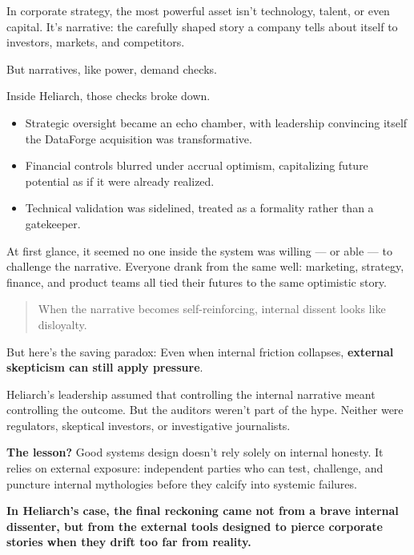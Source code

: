 In corporate strategy, the most powerful asset isn’t technology, talent, or even capital.  
It’s narrative: the carefully shaped story a company tells about itself to investors, markets, and competitors.

\medskip

But narratives, like power, demand checks.

\medskip

Inside Heliarch, those checks broke down.

\begin{itemize}
    \item Strategic oversight became an echo chamber, with leadership convincing itself the DataForge acquisition was transformative.
    \item Financial controls blurred under accrual optimism, capitalizing future potential as if it were already realized.
    \item Technical validation was sidelined, treated as a formality rather than a gatekeeper.
\end{itemize}

At first glance, it seemed no one inside the system was willing — or able — to challenge the narrative.  
Everyone drank from the same well: marketing, strategy, finance, and product teams all tied their futures to the same optimistic story.

\medskip

\begin{quote}
    When the narrative becomes self-reinforcing, internal dissent looks like disloyalty.
\end{quote}

But here’s the saving paradox:  
Even when internal friction collapses, \textbf{external skepticism can still apply pressure}.

\medskip

Heliarch’s leadership assumed that controlling the internal narrative meant controlling the outcome.  
But the auditors weren’t part of the hype.  
Neither were regulators, skeptical investors, or investigative journalists.

\medskip

\textbf{The lesson?}  
Good systems design doesn’t rely solely on internal honesty.  
It relies on external exposure: independent parties who can test, challenge, and puncture internal mythologies before they calcify into systemic failures.

\medskip

\textbf{In Heliarch’s case, the final reckoning came not from a brave internal dissenter, but from the external tools designed to pierce corporate stories when they drift too far from reality.}

